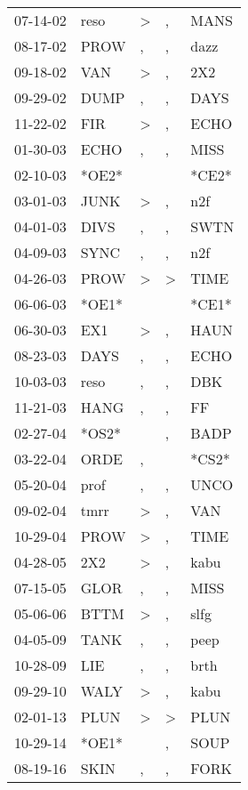 \begin{supertabular}{lllll}
 07-14-02 &   reso &  \textgreater &             , &   MANS \\
 08-17-02 &   PROW &             , &             , &   dazz \\
 09-18-02 &    VAN &  \textgreater &             , &    2X2 \\
 09-29-02 &   DUMP &             , &             , &   DAYS \\
 11-22-02 &    FIR &  \textgreater &             , &   ECHO \\
 01-30-03 &   ECHO &             , &             , &   MISS \\
 02-10-03 &  *OE2* &               &               &  *CE2* \\
 03-01-03 &   JUNK &  \textgreater &             , &    n2f \\
 04-01-03 &   DIVS &             , &             , &   SWTN \\
 04-09-03 &   SYNC &             , &             , &    n2f \\
 04-26-03 &   PROW &  \textgreater &  \textgreater &   TIME \\
 06-06-03 &  *OE1* &               &               &  *CE1* \\
 06-30-03 &    EX1 &  \textgreater &             , &   HAUN \\
 08-23-03 &   DAYS &             , &             , &   ECHO \\
 10-03-03 &   reso &             , &             , &    DBK \\
 11-21-03 &   HANG &             , &             , &     FF \\
 02-27-04 &  *OS2* &               &             , &   BADP \\
 03-22-04 &   ORDE &             , &               &  *CS2* \\
 05-20-04 &   prof &             , &             , &   UNCO \\
 09-02-04 &   tmrr &  \textgreater &             , &    VAN \\
 10-29-04 &   PROW &  \textgreater &             , &   TIME \\
 04-28-05 &    2X2 &  \textgreater &             , &   kabu \\
 07-15-05 &   GLOR &             , &             , &   MISS \\
 05-06-06 &   BTTM &  \textgreater &             , &   slfg \\
 04-05-09 &   TANK &             , &             , &   peep \\
 10-28-09 &    LIE &             , &             , &   brth \\
 09-29-10 &   WALY &  \textgreater &             , &   kabu \\
 02-01-13 &   PLUN &  \textgreater &  \textgreater &   PLUN \\
 10-29-14 &  *OE1* &               &             , &   SOUP \\
 08-19-16 &   SKIN &             , &             , &   FORK \\
\end{supertabular}
